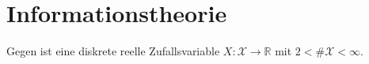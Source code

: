 
\newpage
\section{Informationstheorie}
Gegen ist eine diskrete reelle Zufallsvariable $X : \mathcal{X} \to \mathbb{R}$ mit $2 < \# \mathcal{X} < \infty$. 
